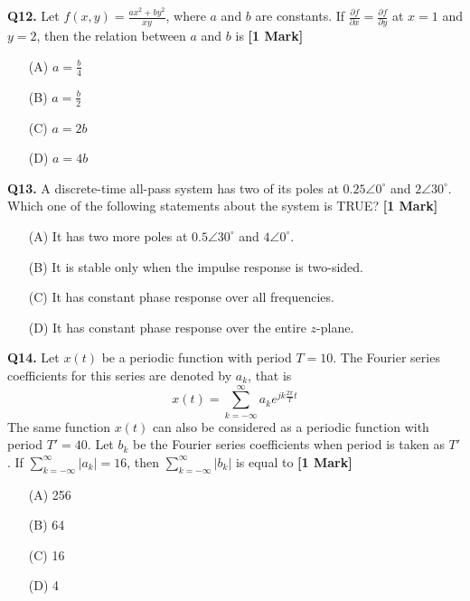 \documentclass[11pt]{article}
\newcommand{\questiona}[2]{
    \noindent\textbf{Q#2.} #1 \hfill \textbf{[1 Mark]}
}
\begin{document}
\vspace{0.5cm}

\questiona{Let $f(x, y) = \frac{ax^2 + by^2}{xy}$, where $a$ and $b$ are constants. If $\frac{\partial f}{\partial x} = \frac{\partial f}{\partial y}$ at $x = 1$ and $y = 2$, then the relation between $a$ and $b$ is}{12}
\begin{enumerate}
    \item[(A)] $a = \frac{b}{4}$
    \item[(B)] $a = \frac{b}{2}$
    \item[(C)] $a = 2b$
    \item[(D)] $a = 4b$
\end{enumerate}

\vspace{0.5cm}

\questiona{A discrete-time all-pass system has two of its poles at $0.25 \angle 0^\circ$ and $2 \angle 30^\circ$. Which one of the following statements about the system is TRUE?}{13}
\begin{enumerate}
    \item[(A)] It has two more poles at $0.5 \angle 30^\circ$ and $4 \angle 0^\circ$.
    \item[(B)] It is stable only when the impulse response is two-sided.
    \item[(C)] It has constant phase response over all frequencies.
    \item[(D)] It has constant phase response over the entire $z$-plane.
\end{enumerate}

\vspace{0.5cm}

\questiona{Let $x(t)$ be a periodic function with period $T = 10$. The Fourier series coefficients for this series are denoted by $a_k$, that is
\[x(t) = \sum_{k=-\infty}^{\infty} a_k e^{jk\frac{2\pi}{T}t}\]
The same function $x(t)$ can also be considered as a periodic function with period $T' = 40$. Let $b_k$ be the Fourier series coefficients when period is taken as $T'$. If $\sum_{k=-\infty}^{\infty}|a_k| = 16$, then $\sum_{k=-\infty}^{\infty}|b_k|$ is equal to}{14}
\begin{enumerate}
    \item[(A)] 256
    \item[(B)] 64
    \item[(C)] 16
    \item[(D)] 4
\end{enumerate}

\vspace{0.5cm}
\end{document}
